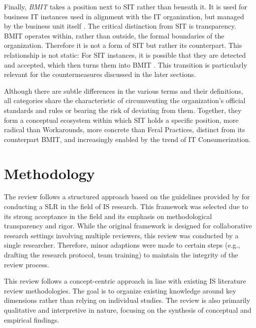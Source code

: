 \documentclass[12pt,oneside]{article}
\begin{document}
Finally, \textit{\ac{BMIT}} takes a position next to \ac{SIT} rather than beneath it. It is used for business \ac{IT} instances used in alignment with the \ac{IT} organization, but managed by the business unit itself \citep[3]{klotz2020shadow}. The critical distinction from \ac{SIT} is transparency. \ac{BMIT} operates within, rather than outside, the formal boundaries of the organization. Therefore it is not a form of \ac{SIT} but rather its counterpart. This relationship is not static: For \ac{SIT} instances, it is possible that they are detected and accepted, which then turns them into \ac{BMIT} \citep[29]{klotz2019causing}. This transition is particularly relevant for the countermeasures discussed in the later sections.

Although there are subtle differences in the various terms and their definitions, all categories share the characteristic of circumventing the organization's official standards and rules or bearing the risk of deviating from them. Together, they form a conceptual ecosystem within which \ac{SIT} holds a specific position, more radical than Workarounds, more concrete than Feral Practices, distinct from its counterpart \ac{BMIT}, and increasingly enabled by the trend of \ac{IT} Consumerization.

\section{Methodology} \label{methodology}

The review follows a structured approach based on the guidelines provided by \citet[887-902]{okoli2015guide} for conducting a \ac{SLR} in the field of \ac{IS} research. This framework was selected due to its strong acceptance in the field and its emphasis on methodological transparency and rigor. While the original framework is designed for collaborative research settings involving multiple reviewers, this review was conducted by a single researcher. Therefore, minor adaptions were made to certain steps (e.g., drafting the research protocol, team training) to maintain the integrity of the review process. 

This review follows a concept-centric approach in line with existing \ac{IS} literature review methodologies. The goal is to organize existing knowledge around key dimensions rather than relying on individual studies. The review is also primarily qualitative and interpretive in nature, focusing on the synthesis of conceptual and empirical findings.
\end{document}
